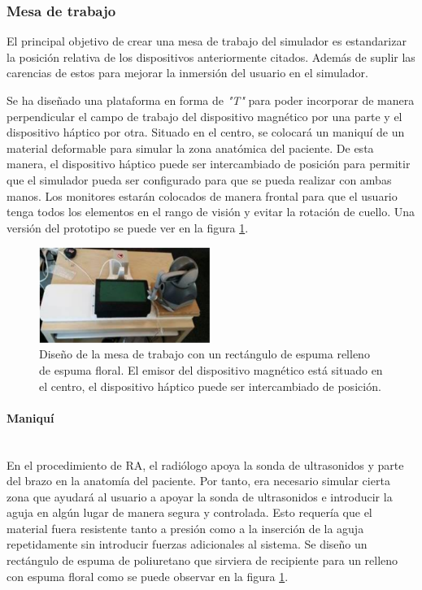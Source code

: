 \subsubsection{Mesa de trabajo}

El principal objetivo de crear una mesa de trabajo del simulador es estandarizar la posición relativa de los dispositivos anteriormente citados. Además de suplir las carencias de estos para mejorar la inmersión del usuario en el simulador.

Se ha diseñado una plataforma en forma de \emph{"T"}  para poder incorporar de manera perpendicular el campo de trabajo del dispositivo magnético por una parte y el dispositivo háptico por otra. Situado en el centro, se colocará un maniquí de un material deformable para simular la zona anatómica del paciente. De esta manera, el dispositivo háptico puede ser intercambiado de posición para permitir que el simulador pueda ser configurado para que se pueda realizar con ambas manos. 
Los monitores estarán colocados de manera frontal para que el usuario tenga todos los elementos en el rango de visión y evitar la rotación de cuello. Una versión del prototipo se puede ver en la figura \ref{fig:simulator}.


\begin{figure}[h]
    \centering
    \includegraphics[width=0.5\textwidth]{IMG/simulator.PNG}
    \caption{Diseño de la mesa de trabajo con un rectángulo de espuma relleno de espuma floral. El emisor del dispositivo magnético está situado en el centro, el dispositivo háptico puede ser intercambiado de posición.}
    \label{fig:simulator}
\end{figure}


\paragraph{Maniquí} \mbox{}\\
En el procedimiento de \ac{RA}, el radiólogo apoya la sonda de ultrasonidos y parte del brazo en la anatomía del paciente. Por tanto, era necesario simular cierta zona que ayudará al usuario a apoyar la sonda de ultrasonidos e introducir la aguja en algún lugar de manera segura y controlada. Esto requería que el material fuera resistente tanto a presión como a la inserción de la aguja repetidamente sin introducir fuerzas adicionales al sistema. Se diseño un rectángulo de espuma de poliuretano que sirviera de recipiente para un relleno con espuma floral como se puede observar en la figura \ref{fig:simulator}.

